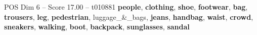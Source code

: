 \begin{textsample}{POS Dim 6 – Score 17.00 – t010881}  \label{ex:f6_pos_012}
\textbf{people}, \textbf{clothing}, \textbf{shoe}, \textbf{footwear}, \textbf{bag}, \textbf{trousers}, \textbf{leg}, \textbf{pedestrian}, luggage\_\&\_bags, \textbf{jeans}, \textbf{handbag}, \textbf{waist}, \textbf{crowd}, \textbf{sneakers}, \textbf{walking}, \textbf{boot}, \textbf{backpack}, \textbf{sunglasses}, \textbf{sandal}

\end{textsample}
